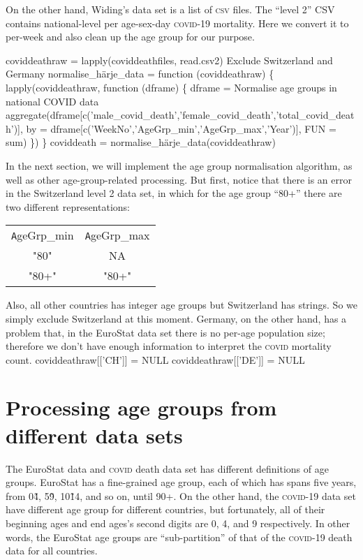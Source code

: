 \documentclass{article}
\begin{document}
On the other hand, Widing's data set is a list of \textsc{csv} files. The ``level 2''
CSV contains national-level per age-sex-day \textsc{covid}-19 mortality. Here we convert it
to per-week and also clean up the age group for our purpose.

\nwenddocs{}\endmoddef
coviddeathraw = lapply(coviddeathfiles, read.csv2)
\LA{}Exclude Switzerland and Germany\RA{}
normalise_härje_data = function (coviddeathraw) \{
    lapply(coviddeathraw, function (dframe) \{
        dframe = \LA{}Normalise age groups in national COVID data\RA{}
        aggregate(dframe[c('male_covid_death','female_covid_death','total_covid_death')],
                  by  = dframe[c('WeekNo','AgeGrp_min','AgeGrp_max','Year')],
                  FUN = sum)
    \})
\}
coviddeath = normalise_härje_data(coviddeathraw)
\nwendcode{}\nwdocspar

In the next section, we will implement the age group normalisation algorithm, as well
as other age-group-related processing. But first, notice that there is an error in the Switzerland
level 2 data set, in which for the age group ``80+'' there are two different representations:
\begin{center}
\begin{tabular}{ c c }
 \texttt AgeGrp\_min & \texttt AgeGrp\_max \\
 "80" & NA  \\
 "80+" & "80+"
\end{tabular}
\end{center}
Also, all other countries has integer age groups but Switzerland has strings. So we simply exclude
Switzerland at this moment. Germany, on the other hand, has a problem that, in the EuroStat data
set there is no per-age population size; therefore we don't have enough information to interpret
the \textsc{covid} mortality count.
\nwenddocs{}\endmoddef
coviddeathraw[['CH']] = NULL
coviddeathraw[['DE']] = NULL
\nwendcode{}\nwdocspar

\section{Processing age groups from different data sets}

The EuroStat data and \textsc{covid} death data set has different definitions of age groups.
EuroStat has a fine-grained age group, each of which has spans five years, from 0\~4,
5\~9, 10\~14, and so on, until 90+. On the other hand, the \textsc{covid}-19 data set have different
age group for different countries, but fortunately, all of their beginning ages and
end ages's second digits are 0, 4, and 9 respectively. In other words, the EuroStat
age groups are ``sub-partition'' of that of the \textsc{covid}-19 death data for all countries.
\end{document}
